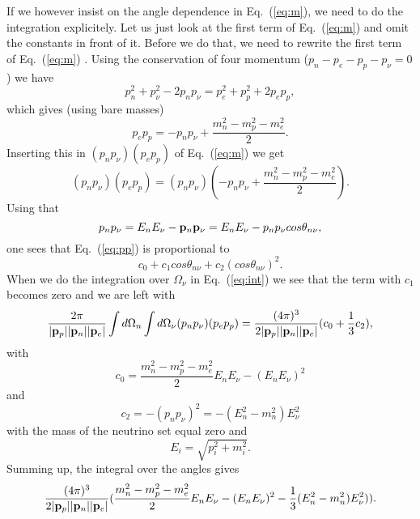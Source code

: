 If we however insist on the angle dependence in Eq.\ (\ref{eq:m}), we need
to do the integration explicitely. Let us just look at the first term of
Eq.\  (\ref{eq:m}) and omit the constants in front of it.
Before we do that, we need to rewrite the first term of Eq.\  (\ref{eq:m}) .
Using the conservation of four momentum
($p_n-p_e-p_p-p_{\nu}=0  $) we have
\begin{equation}
      p_n^2+p_{\nu}^2-2p_{n}p_{\nu}=p_{e}^2+p_{p}^2+2p_{e}p_{p},
\end{equation}
which gives
(using bare masses) 
\begin{equation}
      p_{e}p_{p}=-p_{n}p_{\nu}+\frac{m_n^2-m_p^2-m_e^2}{2}.
\end{equation}
Inserting this in $(p_np_{\nu})(p_ep_p)$ of Eq.\  (\ref{eq:m}) 
we get
\begin{equation}
      (p_np_{\nu})(p_ep_p)=(p_np_{\nu})(-p_{n}p_{\nu}+\frac{m_n^2-m_p^2-m_e^2}{2} ).
      \label{eq:pp}
\end{equation}
Using that
\begin{equation}
      p_np_{\nu}= E_nE_{\nu}-{\bf p}_n{\bf p}_{\nu}=E_nE_{\nu}-p_np_{\nu}cos\theta_{n\nu},
\end{equation}
one sees that Eq.\ (\ref{eq:pp}) is proportional to
\begin{equation} 
     c_0 + c_1cos\theta_{n\nu} + c_2(cos\theta_{n\nu})^2.
\end{equation}
When we do the integration over $\Omega_{\nu}$ in Eq.\ (\ref{eq:int}) we see that
the term with $c_1$ becomes zero and we are left with 
\begin{equation}
    \frac{2\pi}{|{\bf p}_p||{\bf p}_n||{\bf p}_e|}
    \int d\Omega_n \int d\Omega_{\nu}(p_np_{\nu})(p_ep_p)=
    \frac{(4\pi)^3}{2|{\bf p}_p||{\bf p}_n||{\bf p}_e|}(c_0+\frac{1}{3}c_2),
\end{equation}
with 
\begin{equation}
      c_0=\frac{m_n^2-m_p^2-m_e^2}{2}E_nE_{\nu}  - (E_nE_{\nu})^2
\end{equation}
and 
\begin{equation}
      c_2=-(p_np_{\nu})^2=-(E_n^2-m_n^2)E_{\nu}^2
\end{equation}
with the mass of the neutrino set equal zero and 
\begin{equation}
      E_i=\sqrt{p_i^2+m_i^2}.
\end{equation}
Summing up, the integral over the angles gives
\begin{equation}
    \frac{(4\pi)^3}{2|{\bf p}_p||{\bf p}_n||{\bf p}_e|}
    (\frac{m_n^2-m_p^2-m_e^2}{2}E_nE_{\nu}  - (E_nE_{\nu})^2-
     \frac{1}{3}(E_n^2-m_n^2)E_{\nu}^2)).
\end{equation}
